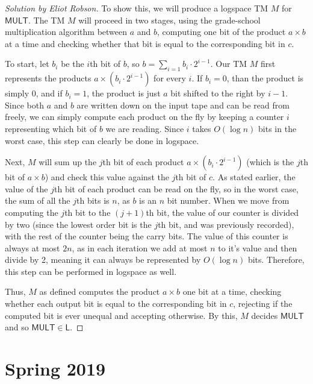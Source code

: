 \documentclass{article}
\newenvironment{solution}[1]{\begin{proof}[Solution by #1]}{\end{proof}}
\newcommand{\MULT}{\mathsf{MULT}}
\newcommand{\Le}{\mathsf{L}}
\begin{document}
\begin{solution}{Eliot Robson}
    To show this, we will produce a logspace TM \(M\) for \(\MULT\). The TM \(M\) will proceed in two stages, using the grade-school multiplication algorithm between \(a\) and \(b\), computing one bit of the product \(a \times b\) at a time and checking whether that bit is equal to the corresponding bit in \(c\).
    
    To start, let \(b_i\) be the \(i\)th bit of \(b\), so \(b = \sum_{i=1} b_i \cdot 2^{i-1}\). Our TM \(M\) first represents the products \(a \times (b_i \cdot 2^{i-1})\) for every \(i\). If \(b_i = 0\), than the product is simply 0, and if \(b_i = 1\), the product is just \(a\) bit shifted to the right by \(i-1\). Since both \(a\) and \(b\) are written down on the input tape and can be read from freely, we can simply compute each product on the fly by keeping a counter \(i\) representing which bit of \(b\) we are reading. Since \(i\) takes \(O(\log n)\) bits in the worst case, this step can clearly be done in logspace.
    
    Next, \(M\) will sum up the \(j\)th bit of each product \(a \times (b_i \cdot 2^{i-1})\) (which is the \(j\)th bit of \(a \times b\)) and check this value against the \(j\)th bit of \(c\). As stated earlier, the value of the \(j\)th bit of each product can be read on the fly, so in the worst case, the sum of all the \(j\)th bits is \(n\), as \(b\) is an \(n\) bit number. When we move from computing the \(j\)th bit to the \((j+1)\)th bit, the value of our counter is divided by two (since the lowest order bit is the \(j\)th bit, and was previously recorded), with the rest of the counter being the carry bits. The value of this counter is always at most \(2n\), as in each iteration we add at most \(n\) to it's value and then divide by 2, meaning it can always be represented by \(O(\log n)\) bits. Therefore, this step can be performed in logspace as well.
    
    Thus, \(M\) as defined computes the product \(a \times b\) one bit at a time, checking whether each output bit is equal to the corresponding bit in \(c\), rejecting if the computed bit is ever unequal and accepting otherwise. By this, \(M\) decides \(\MULT\) and so \(\MULT \in \Le\).
\end{solution}


\section{Spring 2019}
\end{document}
